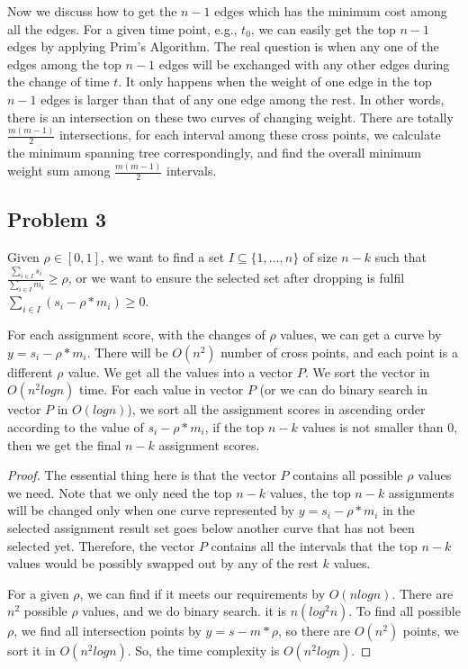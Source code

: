 \documentclass[paper=a4, fontsize=11pt]{scrartcl} %
\numberwithin{equation}{section} %
\numberwithin{figure}{section} %
\numberwithin{table}{section} %
\begin{document}
Now we discuss how to get the $n-1$ edges which has the minimum cost among all the edges. For a given time point, e.g., $t_0$, we can easily get the top $n-1$ edges by applying Prim's Algorithm. The real question is when any one of the edges among the top $n-1$ edges will be exchanged with any other edges during the change of time $t$. It only happens when the weight of one edge in the top $n-1$ edges is larger than that of any one edge among the rest. In other words, there is an intersection on these two curves of changing weight. There are totally $\frac{m(m-1)}{2}$ intersections, for each interval among these cross points, we calculate the minimum spanning tree correspondingly, and find the overall minimum weight sum among $\frac{m(m-1)}{2}$ intervals. 


\subsection*{Problem 3}



Given $\rho \in [0, 1]$, we want to find a set $I \subseteq \{1,...,n\}$ of size $n-k$ such that $\frac{\sum_{i \in I}{s_i}}{\sum_{i \in I}{m_i}} \geq \rho$, or we want to ensure the selected set after dropping is fulfil $\sum_{i \in I}(s_i - \rho * m_i) \geq 0$. 


For each assignment score, with the changes of $\rho$ values, we can get a curve by $y = s_i - \rho * m_i$. There will be $O(n^2)$ number of cross points, and each point is a different $\rho$ value.
We get all the values into a vector $P$. We sort the vector in $O(n^2logn)$ time. For each value in vector $P$ (or we can do binary search in vector $P$ in $O(logn)$), we sort all the assignment scores in ascending order according to the value of $s_i - \rho * m_i$, if the top $n-k$ values is not smaller than $0$, then we get the final $n-k$ assignment scores. 

\begin{proof}

The essential thing here is that the vector $P$ contains all possible $\rho$ values we need. Note that we only need the top $n-k$ values, the top $n-k$ assignments will be changed only when one curve represented by $y = s_i - \rho * m_i$ in the selected assignment result set goes below another curve that has not been selected yet. Therefore, the vector $P$ contains all the intervals that the top $n-k$ values would be possibly swapped out by any of the rest $k$ values. 

For a given $\rho$, we can find if it meets our requirements by $O(nlogn)$. There are $n^2$ possible $\rho$ values, and we do binary search. it is $n(log^2n)$. To find all possible $\rho$, we find all intersection points by $y = s - m * \rho$, so there are $O(n^2)$ points, we sort it in $O(n^2logn)$. So, the time complexity is $O(n^2logn)$.


\end{proof}
\end{document}
